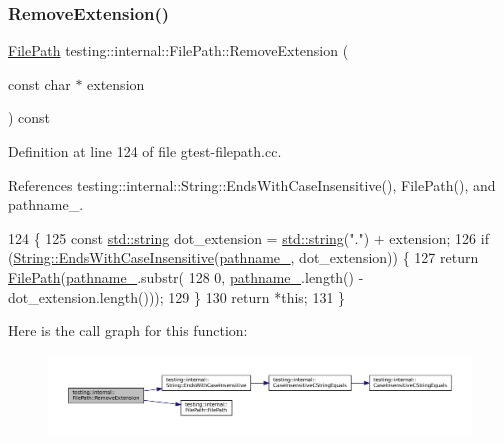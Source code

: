 \subsubsection{\texorpdfstring{Remove\+Extension()}{RemoveExtension()}}
{\footnotesize\ttfamily \hyperlink{classtesting_1_1internal_1_1FilePath}{File\+Path} testing\+::internal\+::\+File\+Path\+::\+Remove\+Extension (\begin{DoxyParamCaption}\item[{const char $\ast$}]{extension }\end{DoxyParamCaption}) const}



Definition at line 124 of file gtest-\/filepath.\+cc.



References testing\+::internal\+::\+String\+::\+Ends\+With\+Case\+Insensitive(), File\+Path(), and pathname\+\_\+.


\begin{DoxyCode}
124                                                               \{
125   \textcolor{keyword}{const} \hyperlink{namespacetesting_1_1internal_a8e8ff5b11e64078831112677156cb111}{std::string} dot\_extension = \hyperlink{namespacetesting_1_1internal_a8e8ff5b11e64078831112677156cb111}{std::string}(\textcolor{stringliteral}{"."}) + extension;
126   \textcolor{keywordflow}{if} (\hyperlink{classtesting_1_1internal_1_1String_a968f242b709f8c7c0ed5ecf246553321}{String::EndsWithCaseInsensitive}(\hyperlink{classtesting_1_1internal_1_1FilePath_a12ce28a0015f85604e0372230fa18d6e}{pathname\_}, dot\_extension)) \{
127     \textcolor{keywordflow}{return} \hyperlink{classtesting_1_1internal_1_1FilePath_a3504a51accbca78a52fe586133ea5499}{FilePath}(\hyperlink{classtesting_1_1internal_1_1FilePath_a12ce28a0015f85604e0372230fa18d6e}{pathname\_}.substr(
128         0, \hyperlink{classtesting_1_1internal_1_1FilePath_a12ce28a0015f85604e0372230fa18d6e}{pathname\_}.length() - dot\_extension.length()));
129   \}
130   \textcolor{keywordflow}{return} *\textcolor{keyword}{this};
131 \}
\end{DoxyCode}
Here is the call graph for this function\+:
\nopagebreak
\begin{figure}[H]
\begin{center}
\leavevmode
\includegraphics[width=350pt]{classtesting_1_1internal_1_1FilePath_aab20b631705b90044d04c67205f2256f_cgraph}
\end{center}
\end{figure}
\mbox{\label{classtesting_1_1internal_1_1FilePath_a49e030b5a62ca7dcc7f920a63a96fa55}} 
